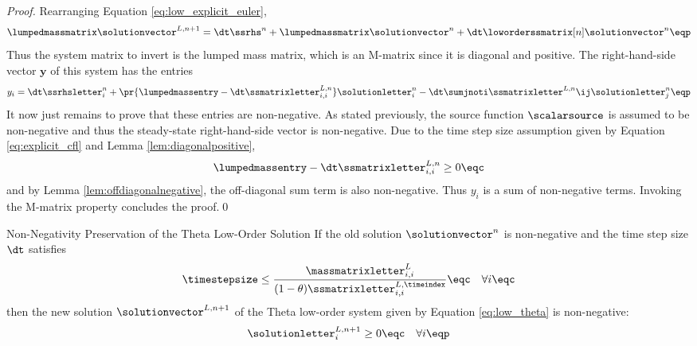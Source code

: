 \begin{proof}
Rearranging Equation \eqref{eq:low_explicit_euler},
\[
  \lumpedmassmatrix\solutionvector^{L,n+1}
    = \dt\ssrhs^n
      + \lumpedmassmatrix\solutionvector^{n}
      + \dt\loworderssmatrix[n]\solutionvector^{n}
  \eqp
\]
Thus the system matrix to invert is the lumped mass matrix, which is
an M-matrix since it is diagonal and positive. The right-hand-side
vector $\mathbf{y}$ of this system has the entries
\[
  y_i
    = \dt\ssrhsletter^n_i
      + \pr{\lumpedmassentry - \dt\ssmatrixletter^{L,n}_{i,i}}
        \solutionletter^n_i
      - \dt\sumjnoti\ssmatrixletter^{L,n}\ij\solutionletter^n_j
  \eqp
\]
It now just remains to prove that these entries are non-negative.
As stated previously, the source function $\scalarsource$ is assumed
to be non-negative and thus the steady-state right-hand-side
vector is non-negative. Due to the time step size assumption
given by Equation \eqref{eq:explicit_cfl} and Lemma \ref{lem:diagonalpositive},
\[
  \lumpedmassentry - \dt\ssmatrixletter^{L,n}_{i,i} \geq 0 \eqc
\]
and by Lemma \ref{lem:offdiagonalnegative}, the off-diagonal
sum term is also non-negative. Thus $y_i$ is a sum of non-negative
terms. Invoking the M-matrix property concludes the proof.\qed
\end{proof}
\begin{theorem}{Non-Negativity Preservation of the Theta Low-Order Solution}
  If the old solution $\solutionvector^n$ is non-negative and
  the time step size $\dt$ satisfies
\begin{equation}\label{eq:theta_cfl}
   \timestepsize \leq \frac{\massmatrixletter^L_{i,i}}{(1-\theta)
     \ssmatrixletter_{i,i}^{L,\timeindex}}
   \eqc\quad\forall i \eqc
\end{equation}
  then the new solution $\solutionvector^{L,n+1}$ of the Theta low-order
  system given by Equation \eqref{eq:low_theta} is non-negative:
  \[
    \solutionletter^{L,n+1}_i \geq 0 \eqc \quad \forall i\eqp
  \]
\end{theorem}

